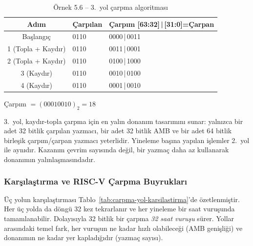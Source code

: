 \begin{ornek}[5.6]
\begin{table}[H]
\centering
\caption{Örnek 5.6 -- 3.\ yol çarpma algoritması}
\label{tab:carpma3-ornek}
\small
\begin{tabular}{c l l}
\toprule
\textbf{Adım} & \textbf{\textcolor{vurgumavi}{Çarpılan}} & \textbf{\textcolor{vurguyesil}{Çarpım [63:32]}\,|\,\textcolor{vurgukirmizi}{[31:0]=Çarpan}} \\
\midrule
Başlangıç & \textcolor{vurgumavi}{0110} & \textcolor{vurguyesil}{0000}\,|\,\textcolor{vurgukirmizi}{0011} \\
1 (Topla + Kaydır) & \textcolor{vurgumavi}{0110} & \textcolor{vurguyesil}{0011}\,|\,\textcolor{vurguyesil}{0}\textcolor{vurgukirmizi}{001} \\
2 (Topla + Kaydır) & \textcolor{vurgumavi}{0110} & \textcolor{vurguyesil}{0100}\,|\,\textcolor{vurguyesil}{10}\textcolor{vurgukirmizi}{00} \\
3 (Kaydır) & \textcolor{vurgumavi}{0110} & \textcolor{vurguyesil}{0010}\,|\,\textcolor{vurguyesil}{010}\textcolor{vurgukirmizi}{0} \\
4 (Kaydır) & \textcolor{vurgumavi}{0110} & \textcolor{vurguyesil}{0001}\,|\,\textcolor{vurguyesil}{0010} \\
\bottomrule
\end{tabular}
\end{table}

Çarpım $= (00010010)_2 = 18$
\end{ornek}

3.\ yol, kaydır-topla çarpma için en yalın donanım tasarımını sunar: yalnızca bir adet 32 bitlik çarpılan yazmacı, bir adet 32 bitlik AMB ve bir adet 64 bitlik birleşik çarpım/çarpan yazmacı yeterlidir. Yineleme başına yapılan işlemler 2.\ yol ile aynıdır. Kazanım çevrim sayısında değil, bir yazmaç daha az kullanarak donanımın yalınlaşmasındadır.

\subsubsection{Karşılaştırma ve RISC-V Çarpma Buyrukları}

Üç yolun karşılaştırması Tablo~\ref{tab:carpma-yol-karsilastirma}'de özetlenmiştir. Her üç yolda da döngü 32 kez tekrarlanır ve her yineleme bir saat vuruşunda tamamlanabilir. Dolayısıyla 32 bitlik bir çarpma \emph{32 saat vuruşu} sürer. Yollar arasındaki temel fark, her vuruşun ne kadar hızlı olabileceği (AMB genişliği) ve donanımın ne kadar yer kapladığıdır (yazmaç sayısı).

